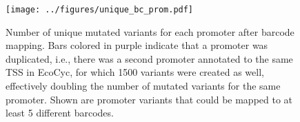 \begin{figure}
    \centering
    \texttt{[image: ../figures/unique\_bc\_prom.pdf]}
    \caption{Number of unique mutated variants for each promoter after barcode mapping. Bars colored in purple indicate that a promoter was duplicated, i.e., there was a second promoter annotated to the same TSS in EcoCyc, for which 1500 variants were created as well, effectively doubling the number of mutated variants for the same promoter. Shown are promoter variants that could be mapped to at least 5 different barcodes.}
    \label{fig:num_uniq_prom_var}
  \end{figure}